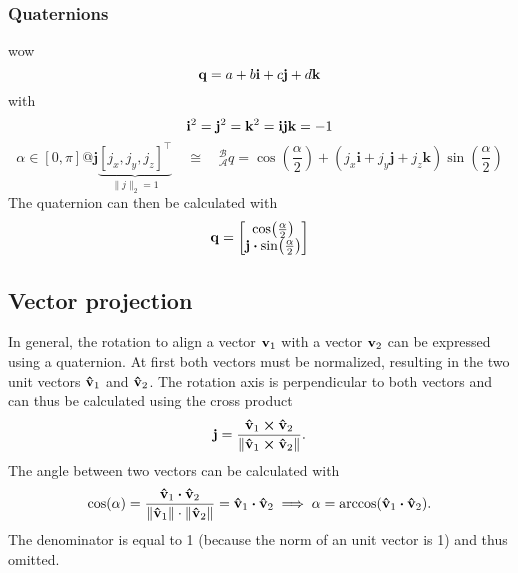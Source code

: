 \subsubsection{Quaternions}
wow
\begin{equation}
	\vb{q} = a + b\vb{i} + c\vb{j} + d\vb{k}
\end{equation}
with
\begin{equation}
	\vb{i}^2 = \vb{j}^2 = \vb{k}^2 = \vb{i}\vb{j}\vb{k} = -1
\end{equation}
\begin{equation}
	\alpha \in[0, \pi] @ \mathbf{j} \underbrace{\left[j_{x}, j_{y}, j_{z}\right]^{\top}}_{\|j\|_{2}=1}
	\quad\cong\quad {}^{\mathcal{B}}_{\mathcal{A}} q
	=\cos \left(\frac{\alpha}{2}\right)+\left(j_{x} \mathbf{i}+j_{y} \mathbf{j}+j_{z} \mathbf{k}\right) \sin \left(\frac{\alpha}{2}\right)
	\end{equation}
The quaternion can then be calculated with
\begin{equation}
	\vb{q} =
	\begin{bmatrix}
		\cos(\frac{\alpha}{2})\\
		\vb{j}\vdot\sin(\frac{\alpha}{2})
	\end{bmatrix}
\end{equation}

\subsection{Vector projection}
\label{subsec:vector_projection}
In general, the rotation to align a vector $\vb{v}_1$ with a vector $\vb{v}_2$ can be expressed using a quaternion.
At first both vectors must be normalized, resulting in the two unit vectors $\vu{v}_1$ and $\vu{v}_2$.
The rotation axis is perpendicular to both vectors and can thus be calculated using the cross product
\begin{equation}
    \vb{j} = \frac{\vu{v}_1 \cp \vu{v}_2}{\norm{\vu{v}_1 \cp \vu{v}_2}}.
\end{equation}
The angle between two vectors can be calculated with
\begin{equation}
    \cos(\alpha) = \frac{\vu{v}_1 \vdot \vu{v}_2}{\norm{\vu{v}_1} \cdot \norm{\vu{v}_2}}
    = \vu{v}_1 \vdot \vu{v}_2 \implies
    \alpha = \arccos(\vu{v}_1 \vdot \vu{v}_2).
\end{equation}
The denominator is equal to 1 (because the norm of an unit vector is 1) and thus omitted.



